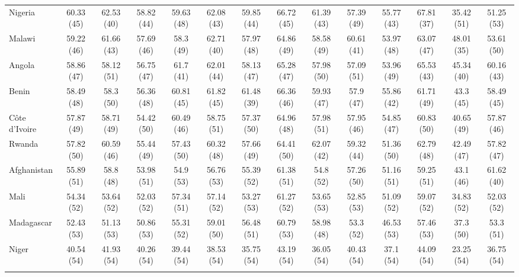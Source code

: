 \begin{landscape}
{\begin{longtable}{lccccccccccccc}
Nigeria & 60.33 (45) & 62.53 (40) & 58.82 (44) & 59.63 (48) & 62.08 (43) & 59.85 (44) & 66.72 (45) & 61.39 (43) & 57.39 (49) & 55.77 (43) & 67.81 (37) & 35.42 (51) & 51.25 (53) \\ 
Malawi & 59.22 (46) & 61.66 (43) & 57.69 (46) & 58.3 (49) & 62.71 (40) & 57.97 (48) & 64.86 (49) & 58.58 (49) & 60.61 (41) & 53.97 (48) & 63.07 (47) & 48.01 (35) & 53.61 (50) \\ 
Angola & 58.86 (47) & 58.12 (51) & 56.75 (47) & 61.7 (41) & 62.01 (44) & 58.13 (47) & 65.28 (47) & 57.98 (50) & 57.09 (51) & 53.96 (49) & 65.53 (43) & 45.34 (40) & 60.16 (43) \\ 
Benin & 58.49 (48) & 58.3 (50) & 56.36 (48) & 60.81 (45) & 61.82 (45) & 61.48 (39) & 66.36 (46) & 59.93 (47) & 57.9 (47) & 55.86 (42) & 61.71 (49) & 43.3 (45) & 58.49 (45) \\ 
Côte d'Ivoire & 57.87 (49) & 58.71 (49) & 54.42 (50) & 60.49 (46) & 58.75 (51) & 57.37 (50) & 64.96 (48) & 57.98 (51) & 57.95 (46) & 54.85 (47) & 60.83 (50) & 40.65 (49) & 57.87 (46) \\ 
Rwanda & 57.82 (50) & 60.59 (46) & 55.44 (49) & 57.43 (50) & 60.32 (48) & 57.66 (49) & 64.41 (50) & 62.07 (42) & 59.32 (44) & 51.36 (50) & 62.79 (48) & 42.49 (47) & 57.82 (47) \\ 
Afghanistan & 55.89 (51) & 58.8 (48) & 53.98 (51) & 54.9 (53) & 56.76 (53) & 55.39 (52) & 61.38 (51) & 54.8 (52) & 57.26 (50) & 51.16 (51) & 59.25 (51) & 43.1 (46) & 61.62 (40) \\ 
Mali & 54.34 (52) & 53.64 (52) & 52.03 (52) & 57.34 (51) & 57.14 (52) & 53.27 (53) & 61.27 (52) & 53.65 (53) & 52.85 (53) & 51.09 (52) & 59.07 (52) & 34.83 (52) & 52.03 (52) \\ 
Madagascar & 52.43 (53) & 51.13 (53) & 50.86 (53) & 55.31 (52) & 59.01 (50) & 56.48 (51) & 60.79 (53) & 58.98 (48) & 53.3 (52) & 46.53 (53) & 57.46 (53) & 37.3 (50) & 53.3 (51) \\ 
Niger & 40.54 (54) & 41.93 (54) & 40.26 (54) & 39.44 (54) & 38.53 (54) & 35.75 (54) & 43.19 (54) & 36.05 (54) & 40.43 (54) & 37.1 (54) & 44.09 (54) & 23.25 (54) & 36.75 (54) \\ 
\hline \\[-1.8ex]
\end{longtable}
}
\end{landscape}